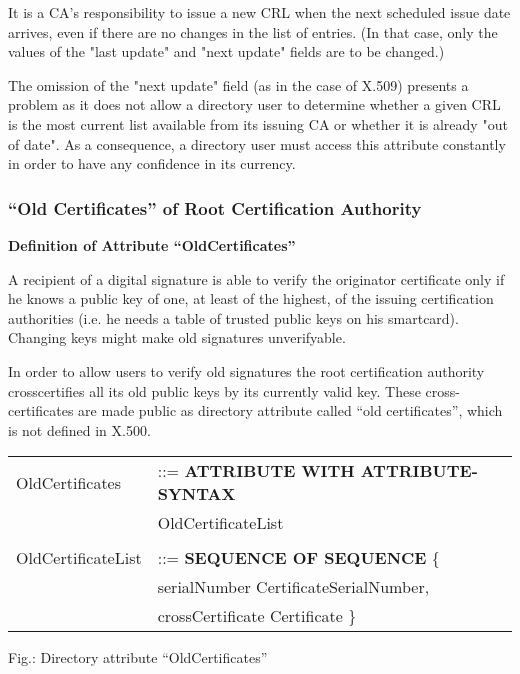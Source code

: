 It is a CA's responsibility to issue a new CRL when the next
scheduled issue date arrives, even if there are no changes in the list
of entries. (In that case, only the values of the "last update" and
"next update" fields are to be changed.)

The omission of the "next update" field (as in the case of X.509)
presents a problem as it does not allow a directory user to determine
whether a given CRL is the most current list available from its issuing
CA or whether it is already "out of date". As a consequence, a directory
user must access this attribute constantly in order to have any confidence
in its currency.

\subsubsection{``Old Certificates'' of Root Certification Authority}
\label{ds-roc}

{\bf Definition of Attribute ``OldCertificates''}
\label{ds-doc}

A recipient of a digital signature is able to verify the originator
certificate only if he knows a
public key of one, at least of the highest,
of the issuing certification authorities
(i.e. he needs a table of trusted public keys on his smartcard).
Changing keys might make old signatures unverifyable.

In order to allow users to verify old signatures
the root certification authority
crosscertifies all its old public keys by its currently valid key.
These cross-certificates are made public as directory attribute
called ``old certificates'', which is not defined in X.500.

\begin {center}
\begin {tabular}{ll}
OldCertificates    & ::= {\small\bf ATTRIBUTE WITH ATTRIBUTE-SYNTAX} \\
		   & OldCertificateList                              \\
		   &                                                 \\
OldCertificateList & ::=  {\small\bf SEQUENCE OF SEQUENCE} \{        \\
		   & serialNumber     CertificateSerialNumber,       \\
		   & crossCertificate Certificate \}
\end {tabular}
\end {center}

\label{fig-ds-doc}
{\footnotesize Fig.: Directory attribute ``OldCertificates''}


